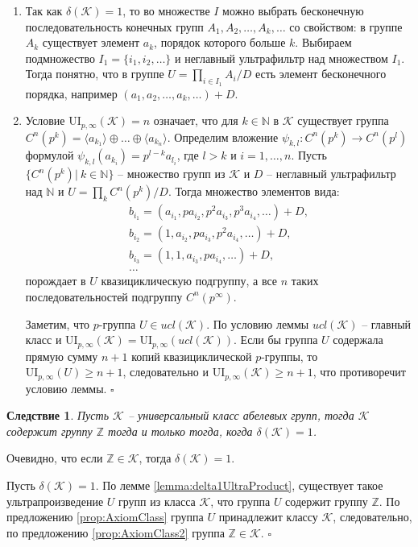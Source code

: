 \documentclass[a4paper,11pt,twoside]{article}
\newtheorem{corollary}{Следствие}[section]
\def\proof{{\noindent{\bf Доказательство.}} }
\def\K{{\mathcal{K}}}
\def\Z{{\mathbb{Z}}}
\def\N{{\mathbb{N}}}
\def\ui{{\mathrm{UI}}}
\begin{document}
\proof 
\begin{enumerate}
\item Так как $\delta(\K) = 1$, то во множестве $I$ можно выбрать бесконечную последовательность конечных групп $A_1, A_2, \ldots, A_k, \ldots$ со свойством: в группе $A_k$ существует элемент $a_k$, порядок которого больше $k$. Выбираем подмножество $I_1 = \{i_1, i_2, \ldots\}$ и неглавный ультрафильтр над множеством $I_1$. Тогда понятно, что в группе $U = \prod\limits_{i \in I_1} A_i \Big/ D$ есть элемент бесконечного порядка, например $(a_1, a_2, \ldots, a_k, \ldots) + D$.

\item Условие $\ui_{p,\infty}(\K) = n$ означает, что для $k \in \N$ в $\K$ существует группа $C^n(p^k) = \langle a_{k_1}\rangle \oplus \ldots \oplus \langle a_{k_n}\rangle$. Определим вложение $\psi_{k,l}: C^n(p^k) \rightarrow C^n(p^l)$ формулой $\psi_{k,l}(a_{k_i}) = p^{l-k}a_{l_i}$, где $l > k$ и $i=1,\dots,n$. Пусть $\{C^n(p^k) | \ k \in \N\}$ -- множество групп из $\K$ и $D$ -- неглавный ультрафильтр над $\N$ и $U = \prod\limits_{k} C^n(p^k) \Big/ D$. Тогда множество элементов вида:
$$\begin{array}{l}
b_{i_1} = (a_{i_1}, p a_{i_2}, p^2 a_{i_3}, p^3 a_{i_4}, \ldots) + D, \\
b_{i_2} = (1, a_{i_2}, p a_{i_3}, p^2 a_{i_4}, \ldots) + D, \\
b_{i_3} = (1, 1, a_{i_3}, p a_{i_4}, \ldots) + D, \\
\ldots
\end{array}$$
порождает в $U$ квазициклическую подгруппу, а все $n$ таких последовательностей подгруппу $C^n(p^\infty)$.

Заметим, что $p$-группа $U \in ucl(\K)$. По условию леммы $ucl(\K)$ -- главный класс и $\ui_{p, \infty} (\K) = \ui_{p,\infty}(ucl(\K))$. Если бы группа $U$ содержала прямую сумму $n+1$ копий квазициклической $p$-группы, то $\ui_{p,\infty} (U) \geq n+1$, следовательно и $\ui_{p,\infty} (\K) \geq n+1$, что противоречит условию леммы. $\square$
\end{enumerate}


\begin{corollary}\label{cor:ContainsZ}
Пусть $\K$ -- универсальный класс абелевых групп, тогда $\K$ содержит группу $\Z$ тогда и только тогда, когда $\delta(\K)=1$.
\end{corollary}
\proof Очевидно, что если $\Z \in \K$, тогда $\delta(\K) = 1$.

Пусть $\delta(\K) = 1$. По лемме \ref{lemma:delta1UltraProduct}, существует такое ультрапроизведение $U$ групп из класса $\K$, что группа $U$ содержит группу $\Z$. По предложению \ref{prop:AxiomClass} группа $U$ принадлежит классу $\K$, следовательно, по предложению \ref{prop:AxiomClass2} группа $\Z \in \K$. $\square$
\end{document}
